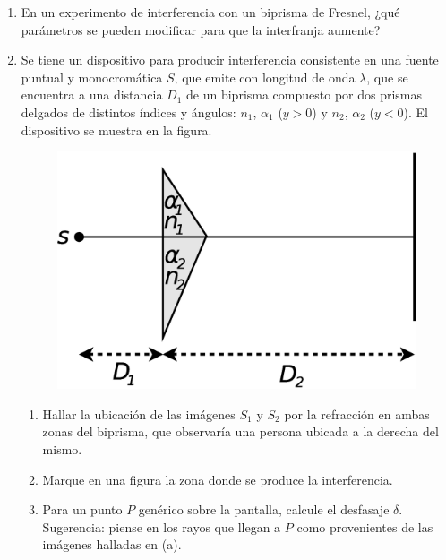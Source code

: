 \documentclass[11pt,spanish]{article}
\begin{document}
\begin{enumerate}
    
    \item En un experimento de interferencia con un biprisma de Fresnel, ¿qué
    parámetros se pueden modificar para que la interfranja aumente?


    \item Se tiene un dispositivo para producir interferencia consistente en
    una fuente puntual y monocromática $S$, que emite con longitud de
    onda $\lambda$, que se encuentra a una distancia $D_{1}$ de un biprisma
    compuesto por dos prismas delgados de distintos índices y ángulos:
    $n_{1}$, $\alpha_{1}$ ($y>0$) y $n_{2}$, $\alpha_{2}$ ($y<0$).
    El dispositivo se muestra en la figura.
    \begin{figure}[H]
        \centering{}
        \includegraphics[clip,scale=0.3]{figs/ej5-15}
    \end{figure}

    \begin{enumerate}
        \item Hallar la ubicación de las imágenes $S_{1}$ y $S_{2}$ por la
        refracción en ambas zonas del biprisma, que observaría una persona
        ubicada a la derecha del mismo. 

        \item Marque en una figura la zona donde se produce la interferencia.

        \item Para un punto $P$ genérico sobre la pantalla, calcule el desfasaje
        $\delta$. Sugerencia: piense en los rayos que llegan a $P$ como
        provenientes de las imágenes halladas en (a).


\end{enumerate}
\end{enumerate}
\end{document}
